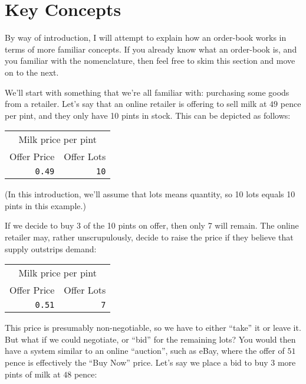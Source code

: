 \documentclass[11pt,a4paper]{article}
\begin{document}
\section{Key Concepts}

By way of introduction, I will attempt to explain how an \gls{order-book} works in terms of more
familiar concepts. If you already know what an \gls{order-book} is, and you familiar with the
nomenclature, then feel free to skim this section and move on to the next.

We'll start with something that we're all familiar with: purchasing some goods from a
retailer. Let's say that an online retailer is offering to sell milk at $49$ pence per pint, and
they only have 10 pints in stock. This can be depicted as follows:

\vspace{5mm}
\begin{tabular}{rr}
\multicolumn{2}{c}{Milk price per pint}\\
Offer Price&Offer Lots\\
\hline
\texttt{0.49}&\texttt{10}\\
\end{tabular}
\vspace{5mm}

(In this introduction, we'll assume that \glspl{lot} means quantity, so 10 \glspl{lot} equals 10
pints in this example.)

If we decide to buy 3 of the 10 pints on \gls{offer}, then only 7 will remain. The online retailer
may, rather unscrupulously, decide to raise the price if they believe that supply outstrips demand:

\vspace{5mm}
\begin{tabular}{rr}
\multicolumn{2}{c}{Milk price per pint}\\
Offer Price&Offer Lots\\
\hline
\texttt{0.51}&\texttt{7}\\
\end{tabular}
\vspace{5mm}

This price is presumably non-negotiable, so we have to either ``take'' it or leave it. But what if
we could negotiate, or ``\gls{bid}'' for the remaining \glspl{lot}? You would then have a system
similar to an online ``\gls{auction}'', such as eBay\cite{ebay}, where the \gls{offer} of $51$ pence
is effectively the ``Buy Now'' price. Let's say we place a \gls{bid} to buy 3 more pints of milk at
$48$ pence:
\end{document}
